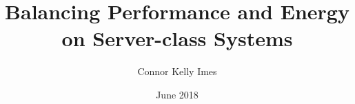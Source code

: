 \documentclass{ucetd}
\title{Balancing Performance and Energy on Server-class Systems}
\author{Connor Kelly Imes}
\date{June 2018}
\begin{document}
\maketitle

\makecopyright
\makededication


\tableofcontents
\listoffigures
\listoftables

\acknowledgments



\mainmatter






\end{document}
